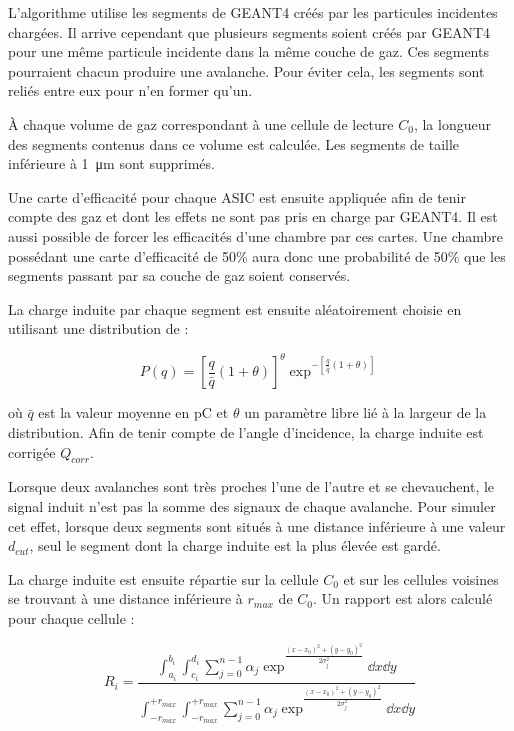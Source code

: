 L'algorithme utilise les segments de GEANT4 créés par les particules incidentes chargées. Il arrive cependant que plusieurs segments soient créés par GEANT4 pour une même particule incidente dans la même couche de gaz. Ces segments pourraient chacun produire une avalanche. Pour éviter cela, les segments sont reliés entre eux pour n'en former qu'un.

 À chaque volume de gaz correspondant à une cellule de lecture $C_{0}$, la longueur des segments contenus dans ce volume est calculée. Les segments de taille inférieure à \SI{1}{\micro\meter} sont supprimés.
 
 Une carte d'efficacité pour chaque ASIC est ensuite appliquée afin de tenir compte des gaz  et  dont les effets ne sont pas pris en charge par GEANT4. Il est aussi possible de forcer les efficacités d'une chambre par ces cartes. Une chambre possédant une carte d'efficacité de 50\% aura donc une probabilité de 50\% que les segments passant par sa couche de gaz soient conservés.
 
 La charge induite par chaque segment est ensuite aléatoirement choisie en utilisant une distribution de :
 
 \begin{equation}
 P(q)=\left[\frac{q}{\bar{q}}(1+\theta)\right]^\theta\exp^{-\left[\frac{q}{\bar{q}}(1+\theta)\right]}
 \end{equation}
 
 où $\bar{q}$ est la valeur moyenne en \si{\pico\coulomb} et $\theta$ un paramètre libre lié à la largeur de la distribution. Afin de tenir compte de l'angle d'incidence, la charge induite est corrigée $Q_{corr}$.
 
 Lorsque deux avalanches sont très proches l'une de l'autre et se chevauchent, le signal induit n'est pas la somme des signaux de chaque avalanche. Pour simuler cet effet, lorsque deux segments sont situés à une distance inférieure à une valeur $d_{cut}$, seul le segment dont la charge induite est la plus élevée est gardé.
 
 La charge induite est ensuite répartie sur la cellule $C_0$ et sur les cellules voisines se trouvant à une distance inférieure à $r_{max}$ de $C_0$. Un rapport est alors calculé pour chaque cellule :
 
 \begin{equation}
 R_i=\frac{\int_{a_i}^{b_i}\int_{c_i}^{d_i}\sum_{j=0}^{n-1}\alpha_j\exp^{\frac{(x-x_0)^2+(y-y_0)^2}{2\sigma_j^2}}\dd x\dd y}{\int_{-r_{max}}^{+r_{max}}\int_{-r_{max}}^{+r_{max}}\sum_{j=0}^{n-1}\alpha_j\exp^{\frac{(x-x_0)^2+(y-y_0)^2}{2\sigma_j^2}}\dd x\dd y}
 \end{equation}
 
